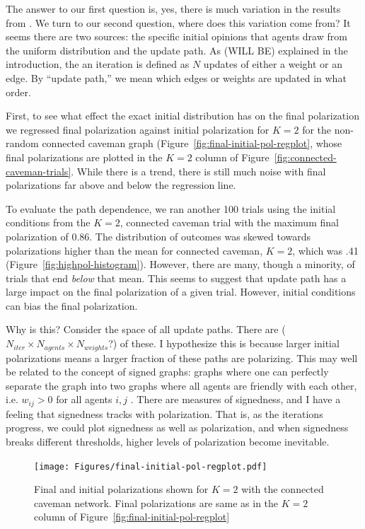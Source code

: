 \documentclass[11pt,letterpaper]{article}
\begin{document}
The answer to our first question is, yes, there is much variation in the 
results from . We turn to our second question, where does
this variation come from? It seems there are two sources: the specific
initial opinions that agents draw from the uniform distribution and the
update path. As (WILL BE) explained in the introduction, the 
an iteration is defined as $N$ updates of either a weight or an edge. 
By ``update path,'' we mean which edges or weights are updated in what order. 

First, to see what effect the exact initial distribution has on the final 
polarization we regressed final polarization against initial polarization for
$K=2$ for the non-random connected caveman graph 
(Figure~\ref{fig:final-initial-pol-regplot}, whose final polarizations are 
plotted in the $K=2$ column of Figure~\ref{fig:connected-caveman-trials}.
While there is a trend, there is still much noise with final polarizations
far above and below the regression line. 

To evaluate the path dependence, we ran another 100 trials using the initial
conditions from the $K=2$, connected caveman trial
with the maximum final polarization of 0.86. The distribution of outcomes was
skewed towards polarizations higher than the mean for connected caveman, $K=2$,
which was .41 (Figure~\ref{fig:highpol-histogram}). However, there are many,
though a minority, of trials that end \emph{below} that mean. This seems to
suggest that update path has a large impact on the final polarization of a
given trial. However, initial conditions can bias the final polarization. 

Why is this? Consider the space of all update paths. 
There are ($N_{iter} \times N_{agents} \times N_{weights}$?) of these.
I hypothesize this is because larger initial polarizations means a larger
fraction of these paths are polarizing. This may well be related to the 
concept of signed graphs: graphs where one can perfectly separate the graph
into two graphs where all agents are friendly with each other, i.e. 
$w_{ij} > 0$ for all agents $i,j$ \cite{Altafini2012}. There are measures of
signedness, and I have a feeling that signedness tracks with polarization.
That is, as the iterations progress, we could plot signedness as well as 
polarization, and when signedness breaks different thresholds, higher levels of
polarization become inevitable.

\begin{figure}[h!]
  \centering
    \texttt{[image: Figures/final-initial-pol-regplot.pdf]}
  \caption{Final and initial polarizations shown for $K=2$ with the connected 
    caveman network. Final polarizations are same as in the $K=2$ column of 
    Figure~\ref{fig:final-initial-pol-regplot}}
  \label{fig:average-trial-caveman-over-k}
\end{figure}
\end{document}
